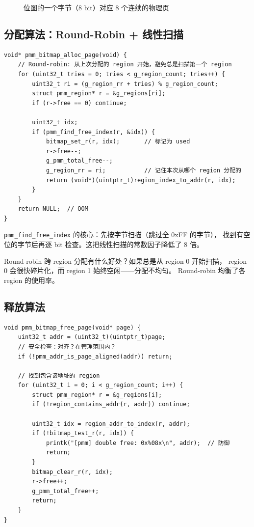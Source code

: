 \begin{figure}[H]
  \centering
  
  \caption{位图的一个字节（8 bit）对应 8 个连续的物理页}
\end{figure}

\subsection{分配算法：Round-Robin + 线性扫描}

\begin{lstlisting}[style=cstyle]
void* pmm_bitmap_alloc_page(void) {
    // Round-robin: 从上次分配的 region 开始，避免总是扫描第一个 region
    for (uint32_t tries = 0; tries < g_region_count; tries++) {
        uint32_t ri = (g_region_rr + tries) % g_region_count;
        struct pmm_region* r = &g_regions[ri];
        if (r->free == 0) continue;

        uint32_t idx;
        if (pmm_find_free_index(r, &idx)) {
            bitmap_set_r(r, idx);       // 标记为 used
            r->free--;
            g_pmm_total_free--;
            g_region_rr = ri;           // 记住本次从哪个 region 分配的
            return (void*)(uintptr_t)region_index_to_addr(r, idx);
        }
    }
    return NULL;  // OOM
}
\end{lstlisting}

\texttt{pmm\_find\_free\_index} 的核心：先按字节扫描（跳过全 0xFF 的字节），
找到有空位的字节后再逐 bit 检查。这把线性扫描的常数因子降低了 8 倍。

\begin{thinkbox}
Round-robin 跨 region 分配有什么好处？如果总是从 region 0 开始扫描，
region 0 会很快碎片化，而 region 1 始终空闲——分配不均匀。
Round-robin 均衡了各 region 的使用率。
\end{thinkbox}

\subsection{释放算法}

\begin{lstlisting}[style=cstyle]
void pmm_bitmap_free_page(void* page) {
    uint32_t addr = (uint32_t)(uintptr_t)page;
    // 安全检查：对齐？在管理范围内？
    if (!pmm_addr_is_page_aligned(addr)) return;

    // 找到包含该地址的 region
    for (uint32_t i = 0; i < g_region_count; i++) {
        struct pmm_region* r = &g_regions[i];
        if (!region_contains_addr(r, addr)) continue;

        uint32_t idx = region_addr_to_index(r, addr);
        if (!bitmap_test_r(r, idx)) {
            printk("[pmm] double free: 0x%08x\n", addr);  // 防御
            return;
        }
        bitmap_clear_r(r, idx);
        r->free++;
        g_pmm_total_free++;
        return;
    }
}
\end{lstlisting}

